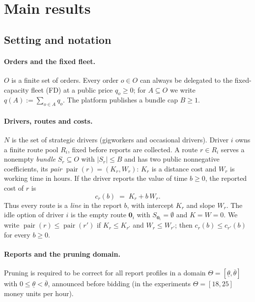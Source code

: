\documentclass[11pt]{article}
\theoremstyle{definition}
\theoremstyle{remark}
\newcommand{\thl}{\underline{\theta}}
\newcommand{\thu}{\overline{\theta}}
\newcommand{\idle}{\mathbf{0}}
\newcommand{\pair}{\operatorname{pair}}
\begin{document}
\section{Main results}
\label{sec:main}

\subsection{Setting and notation}
\label{sec:setting}

\paragraph{Orders and the fixed fleet.}
$O$ is a finite set of orders. Every order $o\in O$ can always be delegated to
the fixed-capacity fleet (FD) at a public price $q_o\ge 0$; for $A\subseteq O$
we write $q(A):=\sum_{o\in A}q_o$. The platform publishes a bundle cap $B\ge1$.

\paragraph{Drivers, routes and costs.}
$N$ is the set of strategic drivers (gigworkers and occasional drivers). Driver
$i$ owns a finite route pool $R_i$, fixed before reports are collected. A route
$r\in R_i$ serves a nonempty \emph{bundle} $S_r\subseteq O$ with $|S_r|\le B$
and has two public nonnegative coefficients, its \emph{pair}
$\pair(r)=(K_r,W_r)$: $K_r$ is a distance cost and $W_r$ is working time in
hours. If the driver reports the value of time $b\ge 0$, the reported cost of
$r$ is
\begin{equation}\label{eq:cost}
  c_r(b)\;=\;K_r+b\,W_r .
\end{equation}
Thus every route is a \emph{line} in the report $b$, with intercept $K_r$ and
slope $W_r$. The idle option of driver $i$ is the empty route $\idle_i$ with
$S_{\idle_i}=\emptyset$ and $K=W=0$. We write
$\pair(r)\le\pair(r')$ if $K_r\le K_{r'}$ and $W_r\le W_{r'}$; then
$c_r(b)\le c_{r'}(b)$ for every $b\ge0$.

\paragraph{Reports and the pruning domain.}
Pruning is required to be correct for all report profiles in a domain
$\Theta=[\thl,\thu]$ with $0\le\thl<\thu$, announced before bidding (in the
experiments $\Theta=[18,25]$ money units per hour).
\end{document}
